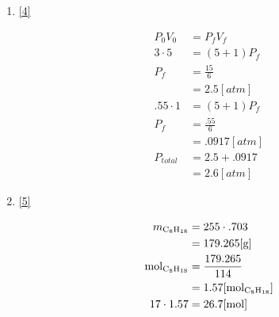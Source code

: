 \documentclass[12pt]{article}
\begin{document}
\begin{enumerate}
\begin{enumerate}
    \end{enumerate}

  \item \eqref{4}

    \begin{equation}
      \begin{split}
      P_0V_0&=P_fV_f\\
      3\cdot5&=(5+1)P_f\\
      P_f&=\frac{15}{6}\\
      &=2.5[atm]\\
      .55\cdot1&=(5+1)P_f\\
      P_f&=\frac{.55}{6}\\
      &=.0917[atm]\\
      P_{total}&=2.5+.0917\\
      &=2.6[atm]
    \end{split}
      \label{4}
    \end{equation}

  \item \eqref{5}

    \begin{equation}
      \begin{split}
        m_{\ce{C8H18}}&=255\cdot.703\\
        &=179.265[\si{\gram}]\\
        \si{\mole}_{\ce{C8H18}}&=\frac{179.265}{114}\\
        &=1.57[\si{\mole}_{\ce{C8H18}}]\\
        17\cdot1.57&=26.7[\si{\mole}]
      \end{split}
      \label{5}
    \end{equation}

\end{enumerate}
\end{document}
